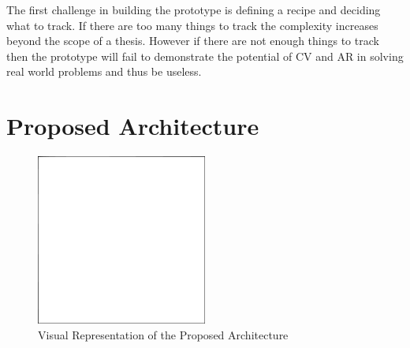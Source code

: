 The first challenge in building the prototype is defining a recipe and 
deciding what to track. If there are too many things to track the complexity 
increases beyond the scope of a thesis. However if there are not enough 
things to track then the prototype will fail to demonstrate the potential of 
CV and AR in solving real world problems and thus be useless.

\section{Proposed Architecture} \label{arch}

\begin{figure}
\centering \includegraphics[width=0.5\textwidth]{kuvat/placeholder.png}
\caption{Visual Representation of the Proposed Architecture}
\label{Arch fig} 
\end{figure}
